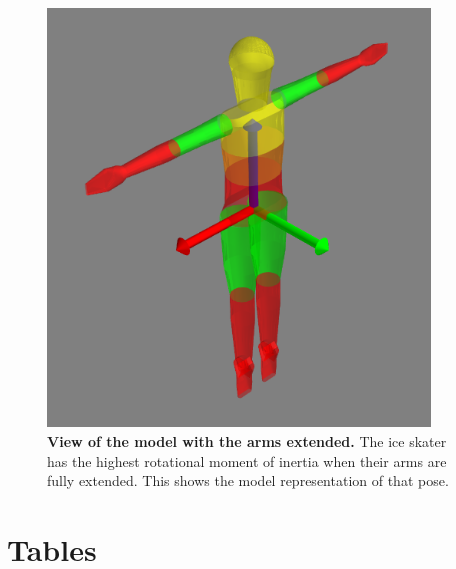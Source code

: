 \documentclass[10pt]{article}
\begin{document}
\begin{figure}[!ht]
  \begin{center}
    \includegraphics[width=4in]{figfactory/iceskater.png}
  \end{center}
  \caption{
    {\bf View of the model with the arms extended.} The ice skater has the
    highest rotational moment of inertia when their arms are fully extended.
    This shows the model representation of that pose.
  }
  \label{fig:iceskater}
\end{figure}

\section*{Tables}
\end{document}
